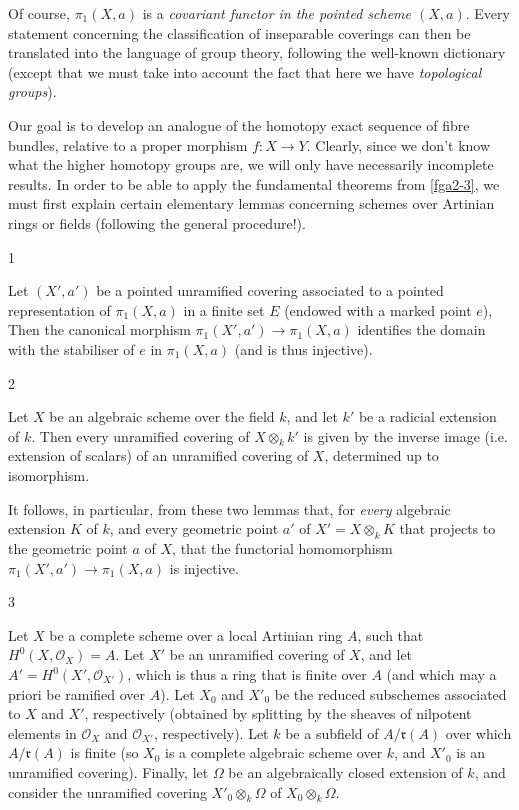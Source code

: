   Of course, \(\pi _1(X,a)\) is a \emph{covariant functor in the pointed scheme \((X,a)\)}.
  Every statement concerning the classification of inseparable coverings can then be translated into the language of group theory, following the well-known dictionary (except that we must take into account the fact that here we have \emph{topological groups}).\par{}Our goal is to develop an analogue of the homotopy exact sequence of fibre bundles, relative to a proper morphism \(f\colon  X\to  Y\).
  Clearly, since we don't know what the higher homotopy groups are, we will only have necessarily incomplete results.
  In order to be able to apply the fundamental theorems from \cref{fga2-3}, we must first explain certain elementary lemmas concerning schemes over Artinian rings or fields (following the general procedure!).\begin{lemma}{1}\label{fga2-lemma-1}\skipsinglepar\par{}Let \((X',a')\) be a pointed unramified covering associated to a pointed representation of \(\pi _1(X,a)\) in a finite set \(E\) (endowed with a marked point \(e\)),
    Then the canonical morphism \(\pi _1(X',a')\to \pi _1(X,a)\) identifies the domain with the stabiliser of \(e\) in \(\pi _1(X,a)\) (and is thus injective).\end{lemma}\begin{lemma}{2}\label{fga2-lemma-2}\skipsinglepar\par{}Let \(X\) be an algebraic scheme over the field \(k\), and let \(k'\) be a radicial extension of \(k\).
    Then every unramified covering of \(X\otimes _kk'\) is given by the inverse image (i.e. extension of scalars) of an unramified covering of \(X\), determined up to isomorphism.\end{lemma}\par{}It follows, in particular, from these two lemmas that, for \emph{every} algebraic extension \(K\) of \(k\), and every geometric point \(a'\) of \(X'=X\otimes _kK\) that projects to the geometric point \(a\) of \(X\), that the functorial homomorphism \(\pi _1(X',a')\to \pi _1(X,a)\) is injective.\begin{lemma}{3}\label{fga2-lemma-3}\skipsinglepar\par{}Let \(X\) be a complete scheme over a local Artinian ring \(A\), such that \(H^0(X,\mathcal {O}_X)=A\).
    Let \(X'\) be an unramified covering of \(X\), and let \(A'=H^0(X',\mathcal {O}_{X'})\), which is thus a ring that is finite over \(A\) (and which may a priori be ramified over \(A\)).
    Let \(X_0\) and \(X'_0\) be the reduced subschemes associated to \(X\) and \(X'\), respectively (obtained by splitting by the sheaves of nilpotent elements in \(\mathcal {O}_X\) and \(\mathcal {O}_{X'}\), respectively).
    Let \(k\) be a subfield of \(A/\mathfrak {r}(A)\) over which \(A/\mathfrak {r}(A)\) is finite (so \(X_0\) is a complete algebraic scheme over \(k\), and \(X'_0\) is an unramified covering).
    Finally, let \(\Omega \) be an algebraically closed extension of \(k\), and consider the unramified covering \(X'_0\otimes _k\Omega \) of \(X_0\otimes _k\Omega \).
    

\end{lemma}
